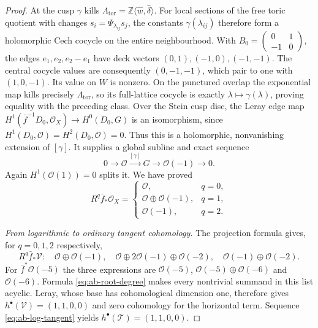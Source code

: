\begin{proof}
At the cusp $\gamma$ kills
$\Lambda_{\mathrm{tor}}=\mathbb Z\langle\widehat w,\widehat\delta\rangle$.
For local sections of the free toric quotient with changes
$s_i=\Psi_{\lambda_{ij}}s_j$, the constants
$\gamma(\lambda_{ij})$ therefore form a holomorphic Cech cocycle
on the entire neighbourhood. With
$B_0=\left(\begin{smallmatrix}0&1\\-1&0\end{smallmatrix}\right)$,
the edges $e_1,e_2,e_2-e_1$ have deck vectors
$(0,1),(-1,0),(-1,-1)$. The central cocycle values are consequently
$(0,-1,-1)$, which pair to one with $(1,0,-1)$.
Its value on $W$ is nonzero. On the punctured overlap the exponential
map kills precisely $\Lambda_{\mathrm{tor}}$, so its full-lattice
cocycle is exactly $\lambda\mapsto\gamma(\lambda)$, proving equality
with the preceding class. Over the Stein cusp disc, the Leray edge
map $H^1(\bar f^{-1}D_0,\mathcal O_X)\to H^0(D_0,G)$ is an
isomorphism, since $H^1(D_0,\mathcal O)=H^2(D_0,\mathcal O)=0$.
Thus this is a holomorphic, nonvanishing extension of $[\gamma]$.
It supplies a global subline and exact sequence
\[
 0\longrightarrow\mathcal O\xrightarrow{[\gamma]}G
 \longrightarrow\mathcal O(-1)\longrightarrow0.
\]
Again $H^1(\mathcal O(1))=0$ splits it. We have proved
\begin{equation}\label{eq:ab-direct-images}
 R^q\bar f_*\mathcal O_X=
 \begin{cases}
 \mathcal O,&q=0,\\
 \mathcal O\oplus\mathcal O(-1),&q=1,\\
 \mathcal O(-1),&q=2.
 \end{cases}
\end{equation}

\emph{From logarithmic to ordinary tangent cohomology.}
The projection formula gives, for $q=0,1,2$ respectively,
\[
 R^q\bar f_*\mathcal V:
 \quad\mathcal O\oplus\mathcal O(-1),\quad
 \mathcal O\oplus2\mathcal O(-1)\oplus\mathcal O(-2),\quad
 \mathcal O(-1)\oplus\mathcal O(-2).
\]
For $\bar f^*\mathcal O(-5)$ the three expressions are
$\mathcal O(-5)$, $\mathcal O(-5)\oplus\mathcal O(-6)$ and
$\mathcal O(-6)$. Formula \eqref{eq:ab-root-degree} makes every
nontrivial summand in this list acyclic. Leray, whose base has
cohomological dimension one, therefore gives
$h^\bullet(\mathcal V)=(1,1,0,0)$ and zero cohomology for the
horizontal term. Sequence \eqref{eq:ab-log-tangent} yields
$h^\bullet(\mathcal T)=(1,1,0,0)$.


\end{proof}
